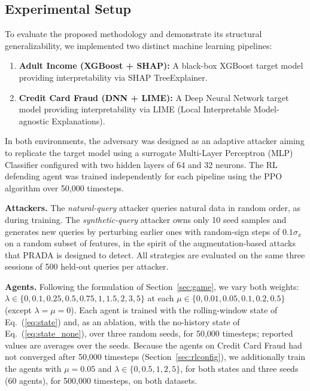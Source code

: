 \documentclass[conference]{IEEEtran}
\DeclareRobustCommand{\rev}[1]{{\color{blue}#1}}
\DeclareRobustCommand{\revnew}[1]{{\color{revpurple}#1}}
\begin{document}
\subsection{Experimental Setup}
\label{sec:setup}
To evaluate the proposed methodology and demonstrate its structural generalizability, we implemented two distinct machine learning pipelines:
\begin{enumerate}
    \item \textbf{Adult Income (XGBoost + SHAP):} A black-box XGBoost target model providing interpretability via SHAP TreeExplainer.
    \item \textbf{Credit Card Fraud (DNN + LIME):} A Deep Neural Network target model providing interpretability via LIME (Local Interpretable Model-agnostic Explanations).
\end{enumerate}

In both environments, the adversary was designed as an adaptive attacker aiming to replicate the target model using a surrogate Multi-Layer Perceptron (MLP) Classifier configured with two hidden layers of 64 and 32 neurons. The RL defending agent was trained independently for each pipeline using the PPO algorithm over 50,000 timesteps.

\rev{\textbf{Attackers.} The \emph{natural-query} attacker queries natural data in random order, as during training. The \emph{synthetic-query} attacker owns only 10 seed samples and generates new queries by perturbing earlier ones with random-sign steps of $0.1\sigma_x$ on a random subset of features, in the spirit of the augmentation-based attacks that PRADA \cite{b17} is designed to detect. All strategies are evaluated on the same three sessions of 500 held-out queries per attacker.}

\rev{\textbf{Agents.} Following the formulation of Section~\ref{sec:game}, we vary both weights: $\lambda \in \{0, 0.1, 0.25, 0.5, 0.75, 1, 1.5, 2, 3, 5\}$ at each $\mu \in \{0, 0.01, 0.05, 0.1, 0.2, 0.5\}$ (except $\lambda=\mu=0$). Each agent is trained with the rolling-window state of Eq.~(\ref{eq:state}) and, as an ablation, with the \revnew{no-history state of Eq.~(\ref{eq:state_none})}, over three random seeds\revnew{, for 50,000 timesteps}; reported values are averages over the seeds. \revnew{Because the agents on Credit Card Fraud had not converged after 50,000 timesteps (Section~\ref{sec:rlconfig}), we additionally train the agents with $\mu=0.05$ and $\lambda \in \{0, 0.5, 1, 2, 5\}$, for both states and three seeds (60 agents), for 500,000 timesteps, on both datasets.}}
\end{document}
